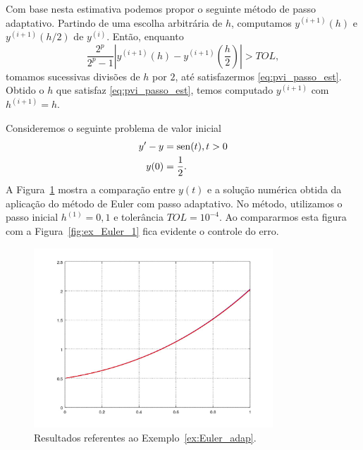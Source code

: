 Com base nesta estimativa podemos propor o seguinte método de passo adaptativo. Partindo de uma escolha arbitrária de $h$, computamos $y^{(i+1)}(h)$ e $y^{(i+1)}(h/2)$ de  $y^{(i)}$. Então, enquanto
\begin{equation}
  \frac{2^p}{2^p-1}\left|y^{(i+1)}(h) - y^{(i+1)}\left(\frac{h}{2}\right)\right| > TOL,
\end{equation}
tomamos sucessivas divisões de $h$ por $2$, até satisfazermos \eqref{eq:pvi_passo_est}. Obtido o $h$ que satisfaz \eqref{eq:pvi_passo_est}, temos computado $y^{(i+1)}$ com $h^{(i+1)}=h$.

\begin{ex}\label{ex:Euler_adap}
  Consideremos o seguinte problema de valor inicial
  \begin{align}
    y' - y &= \operatorname{sen}(t), t>0\\
    y(0) &= \frac{1}{2}.
  \end{align}
  A Figura~\ref{fig:ex_Euler_adap} mostra a comparação entre $y(t)$ e a solução numérica obtida da aplicação do método de Euler com passo adaptativo. No método, utilizamos o passo inicial $h^{(1)}=0,1$ e tolerância $TOL=10^{-4}$. Ao compararmos esta figura com a Figura~\eqref{fig:ex_Euler_1} fica evidente o controle do erro.

  \begin{figure}[h!]
    \centering
    \includegraphics[width=0.8\textwidth]{./cap_pvi/dados/ex_Euler_adap/ex_Euler_adap}
    \caption{Resultados referentes ao Exemplo~\ref{ex:Euler_adap}.}
    \label{fig:ex_Euler_adap}
  \end{figure}



\end{ex}
